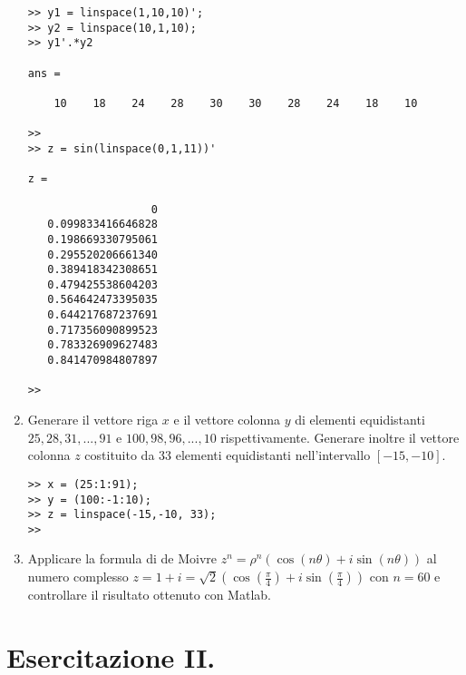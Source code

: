 \begin{enumerate}
\begin{svol}
\begin{codice}
\begin{verbatim}
>> y1 = linspace(1,10,10)';
>> y2 = linspace(10,1,10);
>> y1'.*y2

ans =

    10    18    24    28    30    30    28    24    18    10

>> 
>> z = sin(linspace(0,1,11))'

z =

                   0
   0.099833416646828
   0.198669330795061
   0.295520206661340
   0.389418342308651
   0.479425538604203
   0.564642473395035
   0.644217687237691
   0.717356090899523
   0.783326909627483
   0.841470984807897

>> 
\end{verbatim}
\end{codice}
\end{svol}

\item \samepage
Generare il vettore riga $x$ e il vettore colonna $y$ di elementi 
equidistanti $25, 28, 31, ..., 91$ e $100, 98, 96, ..., 10$ rispettivamente. 
Generare inoltre il vettore colonna $z$ costituito da 33 elementi 
equidistanti nell’intervallo $[−15, −10]$.

\begin{svol}
\begin{codice}
\begin{verbatim}
>> x = (25:1:91);
>> y = (100:-1:10);
>> z = linspace(-15,-10, 33);
>> 
\end{verbatim}
\end{codice}
\end{svol}

\item 
Applicare la formula di de Moivre $z^n = \rho^n (\cos(n\theta) + i 
\sin(n\theta))$ al numero complesso $z = 1 + i = \sqrt{2}(\cos(\frac{\pi}{4})
 + i \sin(\frac{\pi}{4}))$ con $n = 60$ e controllare il risultato ottenuto 
con Matlab.

\end{enumerate}

\section{Esercitazione II.}

